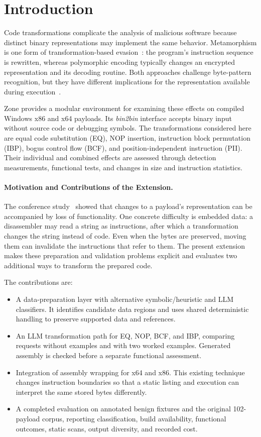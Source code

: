 \documentclass[runningheads]{llncs}
\begin{document}
\section{Introduction}\label{sec:introduction}

Code transformations complicate the analysis of malicious software because distinct binary representations may implement the same behavior. Metamorphism is one form of transformation-based evasion~\cite{PEsurveybible}: the program's instruction sequence is rewritten, whereas polymorphic encoding typically changes an encrypted representation and its decoding routine. Both approaches challenge byte-pattern recognition, but they have different implications for the representation available during execution~\cite{metamorphic1,metamorphic2}.

Zone provides a modular environment for examining these effects on compiled Windows x86 and x64 payloads. Its \emph{bin2bin} interface accepts binary input without source code or debugging symbols. The transformations considered here are equal code substitution (EQ), NOP insertion, instruction block permutation (IBP), bogus control flow (BCF), and position-independent instruction (PII). Their individual and combined effects are assessed through detection measurements, functional tests, and changes in size and instruction statistics.

\paragraph{Motivation and Contributions of the Extension.}
The conference study~\cite{zone_secrypt_2026} showed that changes to a
payload's representation can be accompanied by loss of functionality.
One concrete difficulty is embedded data: a disassembler may read a string
as instructions, after which a transformation changes the string instead
of code. Even when the bytes are preserved, moving them can invalidate
the instructions that refer to them. The present extension makes these
preparation and validation problems explicit and evaluates two additional
ways to transform the prepared code.

The contributions are:
\begin{itemize}
\item A data-preparation layer with alternative symbolic/heuristic and
LLM classifiers. It identifies candidate data regions and uses shared
deterministic handling to preserve supported data and references.
\item An LLM transformation path for EQ, NOP, BCF, and IBP, comparing
requests without examples and with two worked examples. Generated
assembly is checked before a separate functional assessment.
\item Integration of assembly wrapping for x64 and x86. This existing
technique changes instruction boundaries so that a static listing and
execution can interpret the same stored bytes differently.
\item A completed evaluation on annotated benign fixtures and the
original 102-payload corpus, reporting classification, build availability,
functional outcomes, static scans, output diversity, and recorded cost.
\end{itemize}
\end{document}
